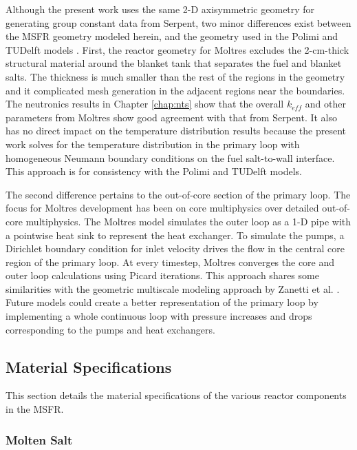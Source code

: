 Although the present work uses the same 2-D axisymmetric geometry for
generating group constant data from Serpent, two minor differences exist
between the \gls{MSFR} geometry modeled herein, and the geometry used in the
Polimi and TUDelft models \cite{fiorina_modelling_2014}. First, the reactor
geometry for
Moltres excludes the 2-cm-thick structural material around the blanket tank
that separates the fuel and blanket salts. The thickness is much smaller than
the rest of the regions in the geometry and it complicated mesh generation in
the adjacent regions near the boundaries. The
neutronics results in Chapter \ref{chap:nts} show that the overall $k_{eff}$
and other parameters from Moltres show good agreement with that from Serpent.
It also has no direct impact on the temperature distribution results because
the present work solves for the temperature distribution in the primary loop
with homogeneous Neumann boundary conditions on the fuel salt-to-wall
interface. This approach is for consistency with the Polimi and TUDelft
models.

The second difference pertains to the out-of-core section of the primary loop.
The focus for Moltres development has been on core multiphysics over detailed
out-of-core multiphysics. The Moltres model simulates the outer loop as a 1-D
pipe with a pointwise heat sink to represent the heat exchanger. To simulate
the pumps, a Dirichlet boundary condition for inlet velocity
drives the flow in the central core region of the primary loop. At every
timestep, Moltres converges the core and outer loop calculations using Picard
iterations. This approach shares some similarities with the
geometric multiscale modeling approach by Zanetti et al.
\cite{zanetti_geometric_2015}. Future models could create a better
representation of the primary loop by implementing a whole continuous loop
with pressure increases and drops corresponding to the pumps and heat
exchangers.

\subsection{Material Specifications}

This section details the material specifications of the various reactor
components in the \gls{MSFR}.

\subsubsection{Molten Salt}

